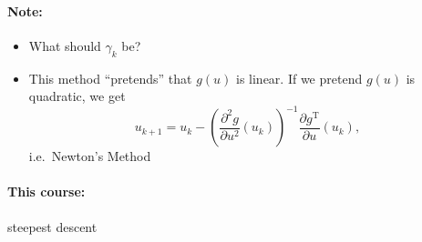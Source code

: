 \documentclass[letterpaper,12pt,titlepage]{report}
\newcommand{\trans}{^\text{T}}
\newcommand*\pder[2]{\frac{\partial #1}{\partial #2}}
\theoremstyle{plain}
\theoremstyle{definition}
\begin{document}
\paragraph{Note:} \mbox{}
\begin{itemize}
\item What should $\gamma_k$ be?
\item This method ``pretends'' that $g(u)$ is linear. If we pretend $g(u)$ is quadratic, we get
  \[ u_{k+1} = u_k - \left( \pder{^2 g}{u^2} (u_k) \right)^{-1} \pder{g\trans}{u} (u_k), \]
  i.e.\ Newton's Method
\end{itemize}

\paragraph{This course:} steepest descent
\end{document}
